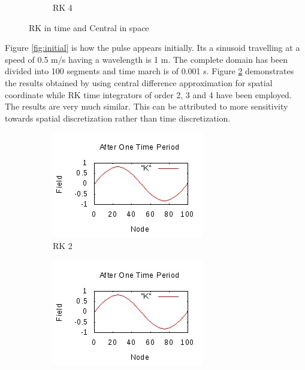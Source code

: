 \documentclass[a4paper,12pt]{report}
\begin{document}
\begin{figure}[h!]
\begin{subfigure}[b]{0.4\textwidth}
                \caption{RK 4}
                \label{fig:rk4ctd}
	\end{subfigure}
	\caption{RK in time and Central in space}
	\label{Central}
\end{figure}
Figure \ref{fig:initial} is how the pulse appears initially. Its a sinusoid travelling at a speed of 0.5 m/s having a wavelength is 1 m. The complete domain has been divided into 100 segments and time march is of 0.001 s. Figure \ref{Central} demonstrates the results obtained by using central difference approximation for spatial coordinate while RK time integrators of order 2, 3 and 4 have been employed. The results are very much similar. This can be attributed to more sensitivity towards spatial discretization rather than time discretization. 
\begin{figure}[h]  
	\centering
	\begin{subfigure}[b]{0.4\textwidth}
		\includegraphics[width=\textwidth]{rk2upw.jpeg}
                \caption{RK 2}
                \label{fig:rk2upw}
	\end{subfigure}
	\begin{subfigure}[b]{0.4\textwidth}
		\includegraphics[width=\textwidth]{rk3upw.jpeg}

\end{subfigure}
\end{figure}
\end{document}
